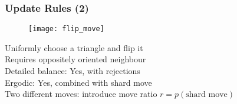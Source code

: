 \begin{frame}
    \frametitle{Update Rules (2)}
    \begin{figure}
        \centering
        \texttt{[image: flip\_move]}
    \end{figure}
    Uniformly choose a triangle and flip it \\
    Requires oppositely oriented neighbour \\
    Detailed balance: Yes, with rejections \\
    Ergodic: Yes, combined with shard move \\
    Two different moves: introduce move ratio $r = p(\text{shard move})$
\end{frame}